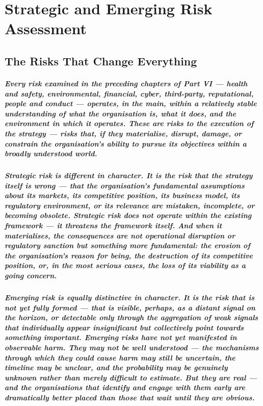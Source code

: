 \chapter{Strategic and Emerging Risk Assessment}
\label{chap:Strategic and Emerging Risk Assessment}

\section{The Risks That Change Everything}
\paragraph{Every risk examined in the preceding chapters of Part VI — health and safety, environmental, financial, cyber, third-party, reputational, people and conduct — operates, in the main, within a relatively stable understanding of what the organisation is, what it does, and the environment in which it operates. These are risks to the execution of the strategy — risks that, if they materialise, disrupt, damage, or constrain the organisation's ability to pursue its objectives within a broadly understood world.}
\paragraph{\textbf{Strategic risk} is different in character. It is the risk that the strategy itself is wrong — that the organisation's fundamental assumptions about its markets, its competitive position, its business model, its regulatory environment, or its relevance are mistaken, incomplete, or becoming obsolete. Strategic risk does not operate within the existing framework — it threatens the framework itself. And when it materialises, the consequences are not operational disruption or regulatory sanction but something more fundamental: the erosion of the organisation's reason for being, the destruction of its competitive position, or, in the most serious cases, the loss of its viability as a going concern.}
\paragraph{\textbf{Emerging risk} is equally distinctive in character. It is the risk that is not yet fully formed — that is visible, perhaps, as a distant signal on the horizon, or detectable only through the aggregation of weak signals that individually appear insignificant but collectively point towards something important. Emerging risks have not yet manifested in observable harm. They may not be well understood — the mechanisms through which they could cause harm may still be uncertain, the timeline may be unclear, and the probability may be genuinely unknown rather than merely difficult to estimate. But they are real — and the organisations that identify and engage with them early are dramatically better placed than those that wait until they are obvious.}
